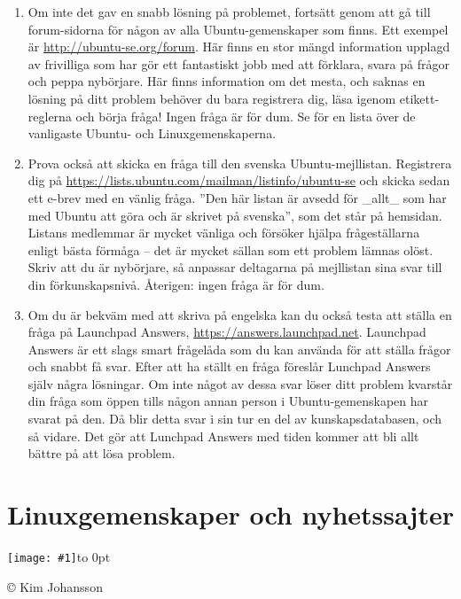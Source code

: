 \documentclass[a4paper,final]{memoir} %
\newcommand{\xrcredit}[1]{\hbox to 0pt{\hspace*{.6\baselineskip}\begin{rotate}{90}{\usefont{T1}{phv}{m}{n}\selectfont\tiny #1}\end{rotate}}}
\newcommand\xintropic[1]{{\texttt{[image: \#1]}\xrcredit{\copyright{} Kim Johansson}}\medskip}
\newcommand\xchapter[2]{\chapter{#2}\begin{center}\xintropic{#1}\end{center}}
\begin{document}
\begin{enumerate}
\item Om inte det gav en snabb lösning på problemet, fortsätt genom att gå till forum-sidorna för någon av alla Ubuntu-gemenskaper som finns. Ett exempel är \url{http://ubuntu-se.org/forum}. Här finns en stor mängd information upplagd av frivilliga som har gör ett fantastiskt jobb med att förklara, svara på frågor och peppa nybörjare. Här finns information om det mesta, och saknas en lösning på ditt problem behöver du bara registrera dig, läsa igenom etikett-reglerna och börja fråga! Ingen fråga är för dum. Se  för en lista över de vanligaste Ubuntu- och Linuxgemenskaperna.

\item Prova också att skicka en fråga till den svenska Ubuntu-mejllistan. Registrera dig på \url{https://lists.ubuntu.com/mailman/listinfo/ubuntu-se} och skicka sedan ett e-brev med en vänlig fråga. ''Den här listan är avsedd för \_allt\_ som har med Ubuntu att göra och är skrivet på svenska'', som det står på hemsidan. Listans medlemmar är mycket vänliga och försöker hjälpa frågeställarna enligt bästa förmåga -- det är mycket sällan som ett problem lämnas olöst. Skriv att du är nybörjare, så anpassar deltagarna på mejllistan sina svar till din förkunskapsnivå. Återigen: ingen fråga är för dum.

\item Om du är bekväm med att skriva på engelska kan du också testa att ställa en fråga på Launchpad Answers, \url{https://answers.launchpad.net}. Launchpad Answers är ett slags smart frågelåda som du kan använda för att ställa frågor och snabbt få svar. Efter att ha ställt en fråga föreslår Lunchpad Answers själv några lösningar. Om inte något av dessa svar löser ditt problem kvarstår din fråga som öppen tills någon annan person i Ubuntu-gemenskapen har svarat på den. Då blir detta svar i sin tur en del av kunskapsdatabasen, och så vidare. Det gör att Lunchpad Answers med tiden kommer att bli allt bättre på att lösa problem.

\end{enumerate}


\xchapter{bilder804-all/hitta_hjalp}{Linuxgemenskaper och nyhetssajter}\label{sec:gemenskaper}

\end{document}
